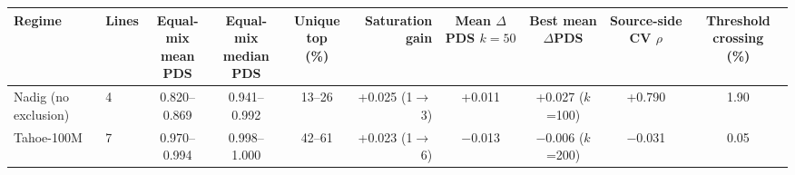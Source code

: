 \documentclass[12pt]{article}
\begin{document}
\begin{singlespace}
\vspace{6pt}
{\scriptsize
\setlength{\tabcolsep}{3pt}
\renewcommand{\arraystretch}{1.1}
\begin{tabular}{@{}llcccrcccc@{}}
\toprule
Regime & Lines & \makecell{Equal-mix\\mean PDS} & \makecell{Equal-mix\\median PDS} & \makecell{Unique top\\(\%)} & \makecell{Saturation\\gain} & \makecell{Mean $\Delta$PDS\\$k=50$} & \makecell{Best mean\\$\Delta$PDS} & \makecell{Source-side\\CV $\rho$} & \makecell{Threshold crossing\\(\%)} \\
\midrule
Nadig (no exclusion) & 4 & 0.820--0.869 & 0.941--0.992 & 13--26 & +0.025 (1$\to$3) & +0.011 & +0.027 ($k$=100) & +0.790 & 1.90 \\
Tahoe-100M & 7 & 0.970--0.994 & 0.998--1.000 & 42--61 & +0.023 (1$\to$6) & $-$0.013 & $-$0.006 ($k$=200) & $-$0.031 & 0.05 \\
\bottomrule
\end{tabular}
}


\end{singlespace}
\end{document}
